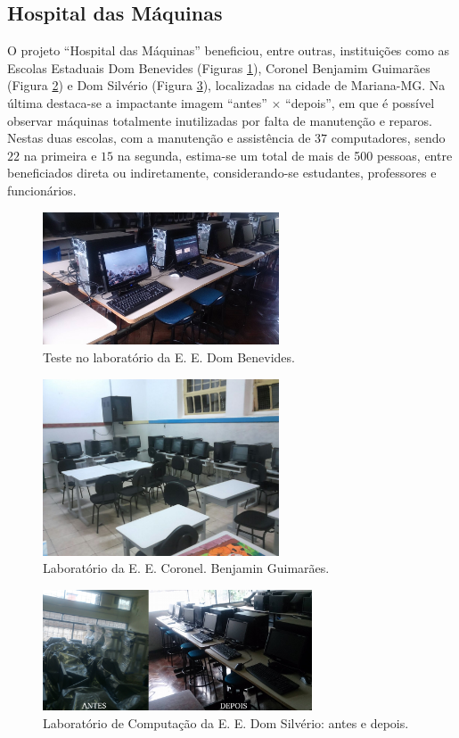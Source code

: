 \documentclass[a4paper]{ifacconf}
\begin{document}
\subsection{Hospital das Máquinas}
O projeto ``Hospital das Máquinas'' beneficiou, entre outras, instituições como as Escolas Estaduais Dom Benevides (Figuras \ref{fig:tela7}), Coronel Benjamim Guimarães (Figura \ref{fig:passagem}) e Dom Silvério (Figura \ref{fig:DSilverio}), localizadas na cidade de Mariana-MG. Na última destaca-se a impactante imagem ``antes'' $\times$ ``depois'', em que é possível observar máquinas totalmente inutilizadas por falta de manutenção e reparos. Nestas duas escolas, com a manutenção e assistência de $37$ computadores, sendo $22$ na primeira e $15$ na segunda, estima-se um total de mais de 500 pessoas, entre beneficiados direta ou indiretamente, considerando-se estudantes, professores e funcionários. 

\begin{figure}
	\centering
	\includegraphics[width=7cm]{figuras/cris07.jpg}
	\caption{Teste no laboratório da E. E. Dom Benevides.}
	\label{fig:tela7}
\end{figure}

\begin{figure}
	\begin{center}
		\includegraphics[width=7cm]{figuras/Passagem01.pdf}
		\caption{Laboratório da E. E. Coronel. Benjamin Guimarães.} 
		\label{fig:passagem}
	\end{center}
\end{figure}

\begin{figure}
\begin{center}
\includegraphics[width=8cm]{figuras/dom-silverio-antes-depois.jpg}
\caption{Laboratório de Computação da E. E. Dom Silvério: antes e depois.} 
\label{fig:DSilverio}
\end{center}
\end{figure}
\end{document}
